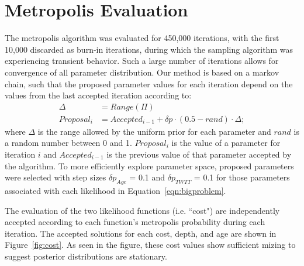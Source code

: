 \renewcommand{\thepage}{S\arabic{page}}  
\renewcommand{\thesection}{S\arabic{section}}   
\renewcommand{\thetable}{S\arabic{table}}   
\renewcommand{\thefigure}{S\arabic{figure}}
\setcounter{figure}{0}

\section{Metropolis Evaluation}

The metropolis algorithm was evaluated for 450,000 iterations, with the first 10,000 discarded as burn-in iterations, during which the sampling algorithm was experiencing transient behavior. Such a large number of iterations allows for convergence of all parameter distribution. Our method is based on a markov chain, such that the proposed parameter values for each iteration depend on the values from the last accepted iteration according to:
\begin{equation}\label{eqn:proposal}
\begin{split}
\Delta&=Range(\Pi) \\
Proposal_i&=Accepted_{i-1} + \delta p \cdot (0.5-rand) \cdot \Delta; 
\end{split}\tag{S1}
\end{equation}
where $\Delta$ is the range allowed by the uniform prior for each parameter and $rand$ is a random number between 0 and 1. $Proposal_i$ is the value of a parameter for iteration $i$ and $Accepted_{i-1}$ is the previous value of that parameter accepted by the algorithm. To more efficiently explore parameter space, proposed parameters were selected with step sizes $\delta p_{Age}$ = 0.1 and $\delta p_{TWTT}$ = 0.1 for those parameters associated with each likelihood in Equation~\ref{eqn:bigproblem}.

The evaluation of the two likelihood functions (i.e. ``cost") are independently accepted according to each function's metropolis probability during each iteration. The accepted solutions for each cost, depth, and age are shown in Figure~\ref{fig:cost}. As seen in the figure, these cost values show sufficient mizing to suggest posterior distributions are stationary.

